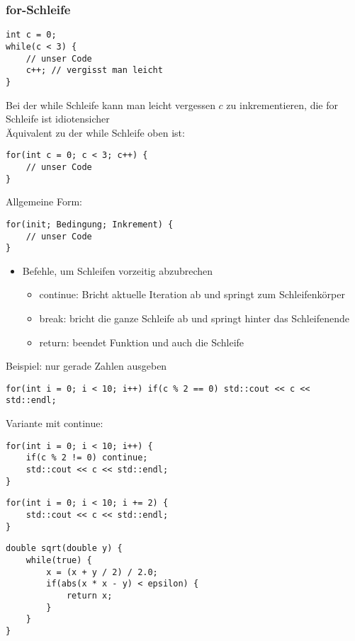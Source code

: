 \documentclass[a4paper]{scrartcl}
\theoremstyle{definition}
\theoremstyle{plain}
\theoremstyle{remark}
\theoremstyle{remark}
\begin{document}
\subsubsection{for-Schleife}
\label{sec-7-2-6}
\begin{verbatim}
int c = 0;
while(c < 3) {
	// unser Code
	c++; // vergisst man leicht
}
\end{verbatim}

Bei der while Schleife kann man leicht vergessen $c$ zu inkrementieren, die for Schleife ist idiotensicher \\
    Äquivalent zu der while Schleife oben ist:
\begin{verbatim}
for(int c = 0; c < 3; c++) {
	// unser Code
}
\end{verbatim}

Allgemeine Form:
\begin{verbatim}
for(init; Bedingung; Inkrement) {
	// unser Code
}
\end{verbatim}
\begin{itemize}
\item Befehle, um Schleifen vorzeitig abzubrechen
\begin{itemize}
\item continue: Bricht aktuelle Iteration ab und springt zum Schleifenkörper
\item break: bricht die ganze Schleife ab und springt hinter das Schleifenende
\item return: beendet Funktion und auch die Schleife
\end{itemize}
\end{itemize}
Beispiel: nur gerade Zahlen ausgeben
\begin{verbatim}
for(int i = 0; i < 10; i++) if(c % 2 == 0) std::cout << c << std::endl;
\end{verbatim}
Variante mit continue:
\begin{verbatim}
for(int i = 0; i < 10; i++) {
	if(c % 2 != 0) continue;
	std::cout << c << std::endl;
}
\end{verbatim}

\begin{verbatim}
for(int i = 0; i < 10; i += 2) {
	std::cout << c << std::endl;
}
\end{verbatim}
\begin{verbatim}
double sqrt(double y) {
	while(true) {
		x = (x + y / 2) / 2.0;
		if(abs(x * x - y) < epsilon) {
			return x;
		}
	}
}
\end{verbatim}
\end{document}

